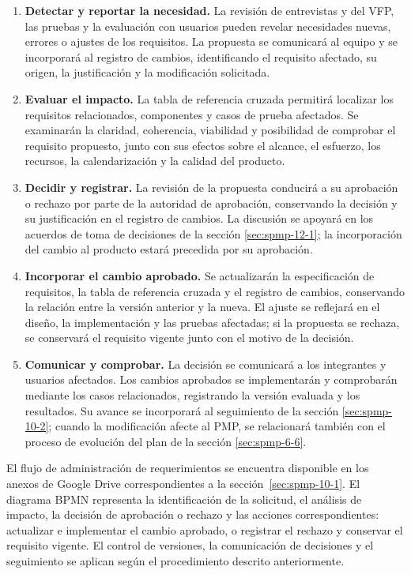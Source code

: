 \begin{enumerate}
\item \textbf{Detectar y reportar la necesidad.} La revisión de entrevistas y del VFP, las pruebas y la evaluación con usuarios pueden revelar necesidades nuevas, errores o ajustes de los requisitos. La propuesta se comunicará al equipo y se incorporará al registro de cambios, identificando el requisito afectado, su origen, la justificación y la modificación solicitada.

\item \textbf{Evaluar el impacto.} La tabla de referencia cruzada permitirá localizar los requisitos relacionados, componentes y casos de prueba afectados. Se examinarán la claridad, coherencia, viabilidad y posibilidad de comprobar el requisito propuesto, junto con sus efectos sobre el alcance, el esfuerzo, los recursos, la calendarización y la calidad del producto.

\item \textbf{Decidir y registrar.} La revisión de la propuesta conducirá a su aprobación o rechazo por parte de la autoridad de aprobación, conservando la decisión y su justificación en el registro de cambios. La discusión se apoyará en los acuerdos de toma de decisiones de la sección \ref{sec:spmp-12-1}; la incorporación del cambio al producto estará precedida por su aprobación.

\item \textbf{Incorporar el cambio aprobado.} Se actualizarán la especificación de requisitos, la tabla de referencia cruzada y el registro de cambios, conservando la relación entre la versión anterior y la nueva. El ajuste se reflejará en el diseño, la implementación y las pruebas afectadas; si la propuesta se rechaza, se conservará el requisito vigente junto con el motivo de la decisión.

\item \textbf{Comunicar y comprobar.} La decisión se comunicará a los integrantes y usuarios afectados. Los cambios aprobados se implementarán y comprobarán mediante los casos relacionados, registrando la versión evaluada y los resultados. Su avance se incorporará al seguimiento de la sección \ref{sec:spmp-10-2}; cuando la modificación afecte al PMP, se relacionará también con el proceso de evolución del plan de la sección \ref{sec:spmp-6-6}.
\end{enumerate}

El flujo de administración de requerimientos se encuentra disponible en los anexos de Google Drive correspondientes a la sección~\ref{sec:spmp-10-1}. El diagrama BPMN representa la identificación de la solicitud, el análisis de impacto, la decisión de aprobación o rechazo y las acciones correspondientes: actualizar e implementar el cambio aprobado, o registrar el rechazo y conservar el requisito vigente. El control de versiones, la comunicación de decisiones y el seguimiento se aplican según el procedimiento descrito anteriormente.